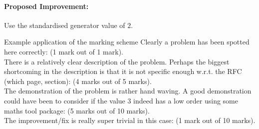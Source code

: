 \documentclass[12pt]{article}
\begin{document}
\paragraph{Proposed Improvement:} Use the standardised generator value of $2$.

\begin{commentbox}{Example application of the marking scheme}
Clearly a problem has been spotted here correctly: (1 mark out of 1 mark). \\
There is a relatively clear description of the problem. Perhaps the biggest shortcoming in the description is that it is not specific enough w.r.t. the RFC (which page, section): (4 marks out of 5 marks).\\
The demonstration of the problem is rather hand waving. A good demonstration could have been to consider if the value $3$ indeed has a low order using some maths tool package: (5 marks out of 10 marks).\\
The improvement/fix is really super trivial in this case: (1 mark out of 10 marks).
\end{commentbox}
\end{document}
